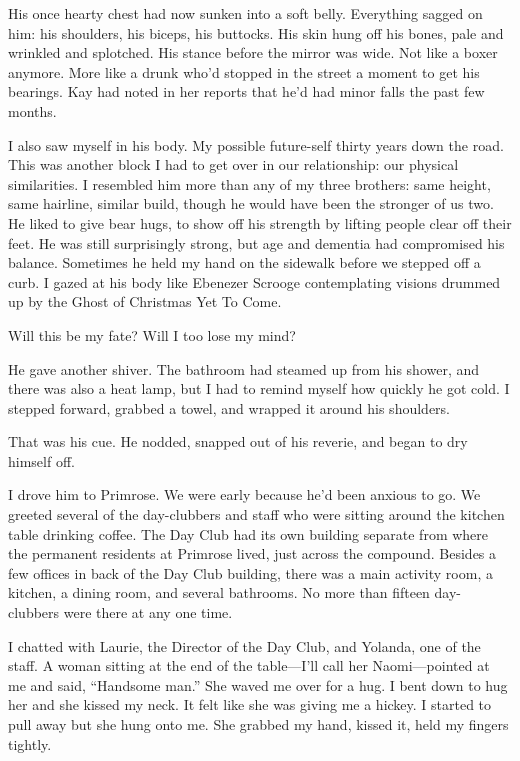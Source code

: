 \documentclass[12pt]{book}
\begin{document}
His once hearty chest had now sunken into a soft belly. Everything sagged on him: his shoulders, his biceps, his buttocks. His skin hung off his bones, pale and wrinkled and splotched. His stance before the mirror was wide. Not like a boxer anymore. More like a drunk who'd stopped in the street a moment to get his bearings. Kay had noted in her reports that he'd had minor falls the past few months.

I also saw myself in his body. My possible future-self thirty years down the road. This was another block I had to get over in our relationship: our physical similarities. I resembled him more than any of my three brothers: same height, same hairline, similar build, though he would have been the stronger of us two. He liked to give bear hugs, to show off his strength by lifting people clear off their feet. He was still surprisingly strong, but age and dementia had compromised his balance. Sometimes he held my hand on the sidewalk before we stepped off a curb. I gazed at his body like Ebenezer Scrooge contemplating visions drummed up by the Ghost of Christmas Yet To Come.

Will this be my fate? Will I too lose my mind?

He gave another shiver. The bathroom had steamed up from his shower, and there was also a heat lamp, but I had to remind myself how quickly he got cold. I stepped forward, grabbed a towel, and wrapped it around his shoulders.

That was his cue. He nodded, snapped out of his reverie, and began to dry himself off.

I drove him to Primrose. We were early because he'd been anxious to go. We greeted several of the day-clubbers and staff who were sitting around the kitchen table drinking coffee. The Day Club had its own building separate from where the permanent residents at Primrose lived, just across the compound. Besides a few offices in back of the Day Club building, there was a main activity room, a kitchen, a dining room, and several bathrooms. No more than fifteen day-clubbers were there at any one time.

I chatted with Laurie, the Director of the Day Club, and Yolanda, one of the staff. A woman sitting at the end of the table---I'll call her Naomi---pointed at me and said, ``Handsome man.'' She waved me over for a hug. I bent down to hug her and she kissed my neck. It felt like she was giving me a hickey. I started to pull away but she hung onto me. She grabbed my hand, kissed it, held my fingers tightly.
\end{document}
